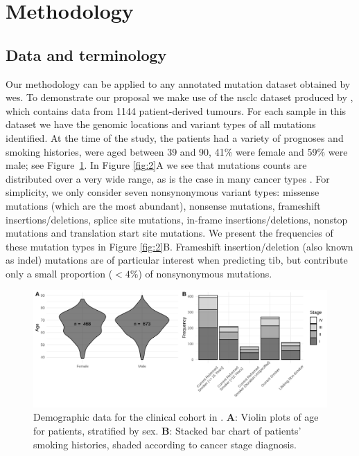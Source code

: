 \documentclass[../thesis.tex]{subfiles}
\begin{document}
\section{Methodology}
\label{sec:methodology}
\subsection{Data and terminology \label{sec:dataterminology}}

Our methodology can be applied to any annotated mutation dataset obtained by \gls{wes}. To demonstrate our proposal we make use of the \gls{nsclc} dataset produced by \citet{campbell_distinct_2016}, which contains data from 1144 patient-derived tumours.  For each sample in this dataset we have the genomic locations and variant types of all mutations identified.  At the time of the study, the patients had a variety of prognoses and smoking histories, were aged between 39 and 90, 41\% were female and 59\% were male; see Figure~\ref{fig:1}. In Figure \ref{fig:2}A we see that mutations counts are distributed over a very wide range, as is the case in many cancer types \citep{chalmers_analysis_2017}. For simplicity, we only consider seven nonsynonymous variant types: missense mutations (which are the most abundant), nonsense mutations, frameshift insertions/deletions, splice site mutations, in-frame insertions/deletions, nonstop mutations and translation start site mutations.  We present the frequencies of these mutation types in Figure \ref{fig:2}B. Frameshift insertion/deletion (also known as indel) mutations are of particular interest when predicting \gls{tib}, but contribute only a small proportion ($<4\%$) of nonsynonymous mutations. 

\begin{figure}[htbp]
\centering
\includegraphics[width=6in]{../figures/chapter3/fig1.png}
\vspace*{-5mm}
\caption{Demographic data for the clinical cohort in \citet{campbell_distinct_2016}. \textbf{A}: Violin plots of age for patients, stratified by sex. \textbf{B}: Stacked bar chart of patients' smoking histories, shaded according to cancer stage diagnosis. \label{fig:1}}
\vspace*{-2mm}
\end{figure}
\end{document}
